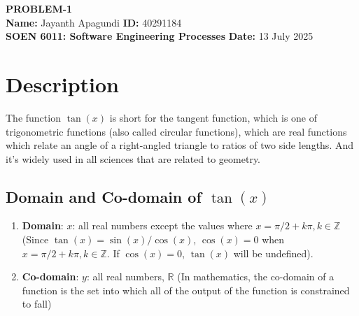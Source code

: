 \documentclass[11pt,a4paper,twoside]{article}
\begin{document}
\begin{center}
{\Large \bfseries PROBLEM-1} \\[0.2cm]
{\bfseries Name:} Jayanth Apagundi \hfill {\bfseries ID:} 40291184 \\[0.1cm]
{\bfseries SOEN 6011: Software Engineering Processes} \hfill {\bfseries Date:} 13 July 2025
\end{center}

\section{Description}
The function $\tan(x)$ is short for the tangent function, which is one of trigonometric functions (also called circular functions), which are real functions which relate an angle of a right-angled triangle to ratios of two side lengths. And it's widely used in all sciences that are related to geometry.

\subsection{Domain and Co-domain of $\tan(x)$}
\begin{enumerate}
\item 
\textbf{Domain}: $x$: all real numbers except the values where $x = \pi /2+k\pi, k\in \mathbb{Z}$ (Since $\tan(x)=\sin(x)/\cos(x)$, $\cos(x)=0$ when $x = \pi /2+k\pi, k\in \mathbb{Z}$. If $\cos(x)=0$, $\tan(x)$ will be undefined).
\item 
\textbf{Co-domain}: $y$: all real numbers, $\mathbb{R}$ (In mathematics, the co-domain of a function is the set into which all of the output of the function is constrained to fall)
\end{enumerate}
\end{document}
